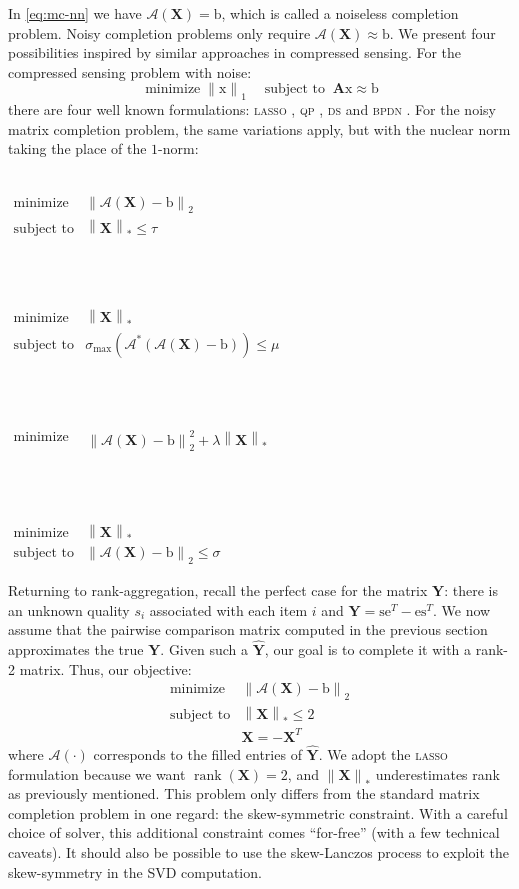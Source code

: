 \documentclass{sig-alternate}
\renewcommand{\cite}{\citep}
\newcommand{\sA}{\mathcal{A}}
\DeclareMathOperator{\rank}{rank}
\newcommand{\algo}[1]{\textsc{\lowercase{#1}}}
\newcommand{\mat}{\boldsymbol}
\renewcommand{\vec}[1]{\boldsymbol{\mathrm{#1}}}
\providecommand{\mYhat}{\ensuremath{\mat{\hat{\mY}}}}
\providecommand{\mA}{\ensuremath{\mat{A}}}
\providecommand{\mX}{\ensuremath{\mat{X}}}
\providecommand{\mY}{\ensuremath{\mat{Y}}}
\providecommand{\vb}{\ensuremath{\vec{b}}}
\providecommand{\ve}{\ensuremath{\vec{e}}}
\providecommand{\vs}{\ensuremath{\vec{s}}}
\providecommand{\vx}{\ensuremath{\vec{x}}}
\DeclareMathOperator*{\minimize}{minimize}
\DeclareMathOperator{\subjectto}{subject\ to}
\providecommand{\MINof}[1][]{{\displaystyle \minimize_{#1}}}
\providecommand{\MIN}[2][]{\begin{array}{ll} \MINof[#1] & #2 \\ \end{array}}
\providecommand{\MINone}[3]{\begin{array}{ll} \MINof[#1] & #2 \\ \subjectto  & #3 \end{array}}
\providecommand{\MINtwo}[4]{\begin{array}{ll} \MINof[#1] & #2 \\ \subjectto  & #3 \\ & #4 \end{array}}
\newcommand{\sstretchsym}[3]{\ensuremath{\left#1 #3 \right#2}}
\newcommand{\nstretchsym}[3]{\ensuremath{#1 #3 #2}}
\newcommand{\normof}[2][]{\sstretchsym{\|}{\|}{#2}_{#1}}
\newcommand{\nnormof}[2][]{\nstretchsym{\|}{\|}{#2}_{#1}}
\begin{document}
In \eqref{eq:mc-nn}
we have $\sA(\mX) = \vb$, which is called a
noiseless completion problem.  Noisy completion
problems only require $\sA(\mX) \approx \vb$.  
We present four possibilities inspired by similar
approaches in compressed sensing.
For the compressed sensing problem with noise:
\[
\minimize \nnormof[1]{\vx} \quad \subjectto \; \mA \vx \approx \vb
\]
there are four well known formulations: 
\algo{Lasso} \cite{tibshirani1996-lasso}, 
\algo{QP}  \cite{chen1998-atomic}, 
\algo{DS}  \cite{candes2007-dantzig}
and \algo{BPDN}  \cite{fuchs2004-noise}.  
For the noisy matrix completion problem, the same variations apply,
but with the nuclear norm taking the place of the $1$-norm:
\begin{center}
\begin{minipage}{\linewidth}
 \\[1ex]
$\MINone{}{\normof[2]{\sA(\mX) - \vb}}{\normof[*]{\mX} \le \tau}$
\end{minipage}\\[2ex]
\begin{minipage}{\linewidth}
  \\[1ex]
$\MINone{}{\normof[*]{\mX}}{\sigma_{\max}(\sA^*(\sA(\mX) - \vb))\le \mu}$
\end{minipage}\\[2ex]
\begin{minipage}{\linewidth}
 \citet{mazumder2009-regularization} \\[1ex]
$\MIN{}{\normof[2]{\sA(\mX) - \vb}^2 + \lambda \normof[*]{\mX}}$
\end{minipage}\\[2ex]
\begin{minipage}{\linewidth}
 \citet{mazumder2009-regularization} \\[1ex]
$\MINone{}{\normof[*]{\mX}}{\normof[2]{\sA(\mX) - \vb}\le \sigma}$
\end{minipage}
\end{center}


Returning to rank-aggregation, 
recall the perfect case for the matrix $\mY$:
there is an unknown quality $s_i$
associated with each item $i$ and
 $\mY = \vs \ve^T - \ve \vs^T$.
We now assume that the pairwise comparison matrix
computed in the previous section approximates 
the true $\mY$.  Given such a $\mYhat$, our goal is to complete
it with a rank-2 matrix.  Thus, our objective:
\begin{equation} \label{eq:ranking-mc}
 \MINtwo{}{\normof[2]{\sA(\mX) - \vb}}{\normof[*]{\mX} \le 2}{\mX = -\mX^T}
\end{equation}
where $\sA(\cdot)$ corresponds to the filled entries of $\mYhat$.
We adopt the \algo{lasso} formulation because we want
$\rank(\mX) = 2$, and $\nnormof[*]{\mX}$ underestimates
rank as previously mentioned.
This problem only differs from the standard matrix completion 
problem in one regard: the skew-symmetric constraint.
With a careful choice of solver, this
additional constraint comes ``for-free'' (with a few technical
caveats).  It should also be possible
to use the skew-Lanczos process to exploit
the skew-symmetry in the SVD computation.  
\end{document}
